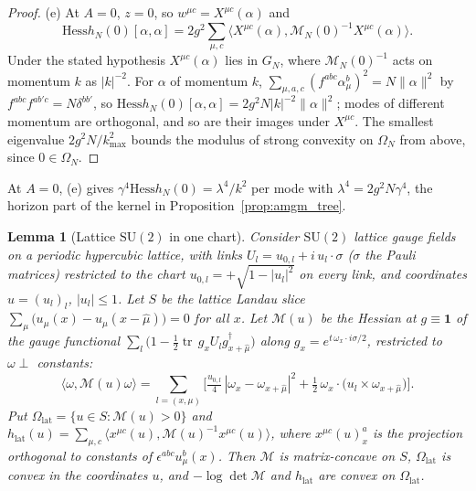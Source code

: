 \documentclass[11pt,a4paper]{amsart}
\newtheorem{lemma}[theorem]{Lemma}
\theoremstyle{definition}
\newcommand{\Hess}{\mathrm{Hess}}
\begin{document}
\begin{proof}
(e) At $A = 0$, $z = 0$, so $w^{\mu c} = X^{\mu c}(\alpha)$ and
\begin{equation*}
    \Hess h_N(0)[\alpha,\alpha] = 2g^2\sum_{\mu,c}\big\langle X^{\mu c}(\alpha), \mathcal{M}_N(0)^{-1}X^{\mu c}(\alpha)\big\rangle .
\end{equation*}
Under the stated hypothesis $X^{\mu c}(\alpha)$ lies in $G_N$, where $\mathcal{M}_N(0)^{-1}$ acts on momentum $k$ as $|k|^{-2}$. For $\alpha$ of momentum $k$, $\sum_{\mu,a,c}(f^{abc}\alpha^b_\mu)^2 = N\|\alpha\|^2$ by $f^{abc}f^{ab'c} = N\delta^{bb'}$, so $\Hess h_N(0)[\alpha,\alpha] = 2g^2N|k|^{-2}\|\alpha\|^2$; modes of different momentum are orthogonal, and so are their images under $X^{\mu c}$. The smallest eigenvalue $2g^2N/k_{\max}^2$ bounds the modulus of strong convexity on $\Omega_N$ from above, since $0 \in \Omega_N$.
\end{proof}

At $A = 0$, (e) gives $\gamma^4\Hess h_N(0) = \lambda^4/k^2$ per mode with $\lambda^4 = 2g^2N\gamma^4$, the horizon part of the kernel in Proposition~\ref{prop:amgm_tree}.

\begin{lemma}[Lattice $\mathrm{SU}(2)$ in one chart]
\label{lem:gz_lattice}
Consider $\mathrm{SU}(2)$ lattice gauge fields on a periodic hypercubic lattice, with links $U_l = u_{0,l} + i\,u_l\cdot\sigma$ ($\sigma$ the Pauli matrices) restricted to the chart $u_{0,l} = +\sqrt{1 - |u_l|^2}$ on every link, and coordinates $u = (u_l)_l$, $|u_l| \le 1$. Let $S$ be the lattice Landau slice $\sum_\mu\big(u_\mu(x) - u_\mu(x - \hat\mu)\big) = 0$ for all $x$. Let $\mathcal{M}(u)$ be the Hessian at $g \equiv \mathbf{1}$ of the gauge functional $\sum_l\big(1 - \tfrac12\operatorname{tr}\,g_xU_lg^\dagger_{x+\hat\mu}\big)$ along $g_x = e^{t\,\omega_x\cdot i\sigma/2}$, restricted to $\omega \perp$ constants:
\begin{equation*}
    \langle\omega,\mathcal{M}(u)\omega\rangle = \sum_{l = (x,\mu)}\Big[\tfrac{u_{0,l}}{4}\,|\omega_x - \omega_{x+\hat\mu}|^2 + \tfrac12\,\omega_x\cdot\big(u_l\times\omega_{x+\hat\mu}\big)\Big].
\end{equation*}
Put $\Omega_{\mathrm{lat}} = \{u \in S : \mathcal{M}(u) > 0\}$ and $h_{\mathrm{lat}}(u) = \sum_{\mu,c}\langle x^{\mu c}(u), \mathcal{M}(u)^{-1}x^{\mu c}(u)\rangle$, where $x^{\mu c}(u)^a_x$ is the projection orthogonal to constants of $\epsilon^{abc}u^b_\mu(x)$. Then $\mathcal{M}$ is matrix-concave on $S$, $\Omega_{\mathrm{lat}}$ is convex in the coordinates $u$, and $-\log\det\mathcal{M}$ and $h_{\mathrm{lat}}$ are convex on $\Omega_{\mathrm{lat}}$.
\end{lemma}
\end{document}
